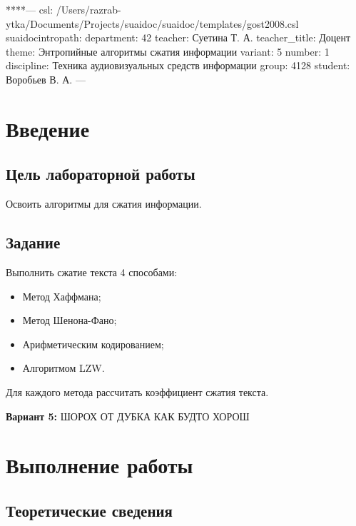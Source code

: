 \documentclass[a4paper]{article}
\def\tightlist{}
\begin{document}
\sloppy
\tableofcontents
****--- csl:
/Users/razrab-ytka/Documents/Projects/suaidoc/suaidoc/templates/gost2008.csl
suaidocintropath:
department: 42 teacher: Суетина Т. А. teacher\_title: Доцент theme:
Энтропийные алгоритмы сжатия информации variant: 5 number: 1 discipline:
Техника аудиовизуальных средств информации group: 4128 student: Воробьев
В. А. ---

\section{Введение}\label{ux432ux432ux435ux434ux435ux43dux438ux435}

\subsection{Цель лабораторной
работы}\label{ux446ux435ux43bux44c-ux43bux430ux431ux43eux440ux430ux442ux43eux440ux43dux43eux439-ux440ux430ux431ux43eux442ux44b}

Освоить алгоритмы для сжатия информации.

\subsection{Задание}\label{ux437ux430ux434ux430ux43dux438ux435}

Выполнить сжатие текста 4 способами:

\begin{itemize}
\tightlist
\item
  Метод Хаффмана;
\item
  Метод Шенона-Фано;
\item
  Арифметическим кодированием;
\item
  Алгоритмом LZW.
\end{itemize}

Для каждого метода рассчитать коэффициент сжатия текста.

\textbf{Вариант 5:} ШОРОХ ОТ ДУБКА КАК БУДТО ХОРОШ

\section{Выполнение
работы}\label{ux432ux44bux43fux43eux43bux43dux435ux43dux438ux435-ux440ux430ux431ux43eux442ux44b}

\subsection{Теоретические
сведения}\label{ux442ux435ux43eux440ux435ux442ux438ux447ux435ux441ux43aux438ux435-ux441ux432ux435ux434ux435ux43dux438ux44f}
\end{document}
